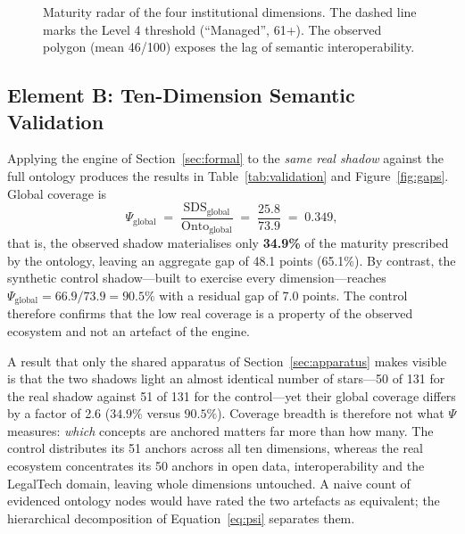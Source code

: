 \documentclass[engproc,article,submit,moreauthors]{Definitions/mdpi}
\begin{document}
\begin{figure}[H]
\centering
{}
\caption{Maturity radar of the four institutional dimensions. The dashed line marks the Level 4 threshold (``Managed'', 61+). The observed polygon (mean 46/100) exposes the lag of semantic interoperability.\label{fig:radar}}
\end{figure}

\subsection{Element B: Ten-Dimension Semantic Validation}
\label{sec:elementB}
Applying the engine of Section~\ref{sec:formal} to the \emph{same real shadow} against the full ontology produces the results in Table~\ref{tab:validation} and Figure~\ref{fig:gaps}. Global coverage is
\[
\Psi_{\mathrm{global}} \;=\; \frac{\mathrm{SDS}_{\mathrm{global}}}{\mathrm{Onto}_{\mathrm{global}}} \;=\; \frac{25.8}{73.9} \;=\; 0.349,
\]
that is, the observed shadow materialises only \textbf{34.9\%} of the maturity prescribed by the ontology, leaving an aggregate gap of 48.1 points (65.1\%). By contrast, the synthetic control shadow---built to exercise every dimension---reaches $\Psi_{\mathrm{global}}=66.9/73.9=90.5\%$ with a residual gap of 7.0 points. The control therefore confirms that the low real coverage is a property of the observed ecosystem and not an artefact of the engine.

A result that only the shared apparatus of Section~\ref{sec:apparatus} makes visible is that the two shadows light an almost identical number of stars---50 of 131 for the real shadow against 51 of 131 for the control---yet their global coverage differs by a factor of 2.6 ($34.9\%$ versus $90.5\%$). Coverage breadth is therefore not what $\Psi$ measures: \emph{which} concepts are anchored matters far more than how many. The control distributes its 51 anchors across all ten dimensions, whereas the real ecosystem concentrates its 50 anchors in open data, interoperability and the LegalTech domain, leaving whole dimensions untouched. A naive count of evidenced ontology nodes would have rated the two artefacts as equivalent; the hierarchical decomposition of Equation~\eqref{eq:psi} separates them.
\end{document}
